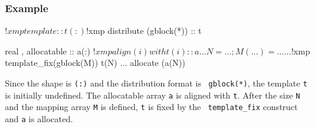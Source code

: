 \subsubsection*{Example}

\begin{XFexample}
!$xmp template :: t(:)
!$xmp distribute (gblock(*)) :: t

      real , allocatable :: a(:)
!$xmp align (i) with t(i) :: a
      ...
      N = ...; M(...) = ...
      ...
!$xmp template_fix(gblock(M)) t(N)
      ...
      allocate (a(N))
\end{XFexample}

Since the shape is {\tt (:)} and the distribution format is {\tt
gblock(*)}, 
the template {\tt t} is initially undefined. The allocatable array
{\tt a} is aligned with {\tt t}. After the size {\tt N} and the
mapping array {\tt M} is defined, {\tt t} is fixed by the {\tt
  template\_fix} construct and {\tt a} is allocated.


